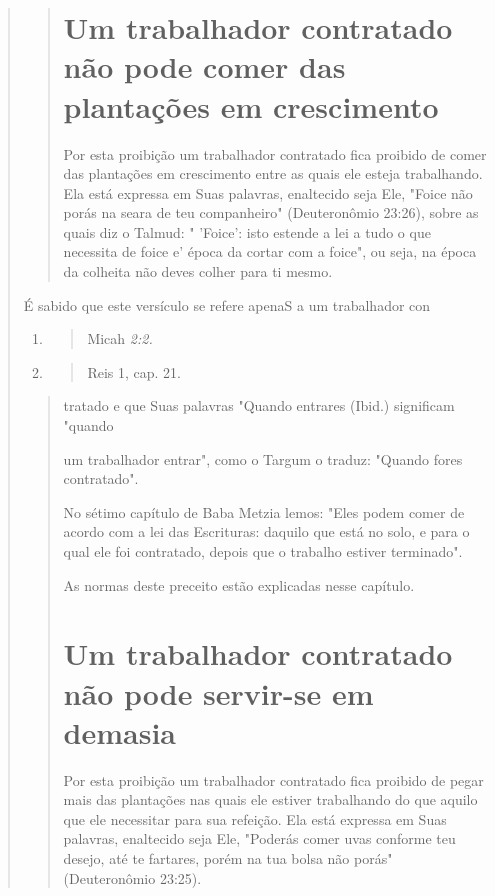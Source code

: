 \begin{quote}
\begin{quote}
\section{Um trabalhador contratado não pode comer das plantações em crescimento}

Por esta proibição um trabalhador contratado fica proibido de co­mer das
plantações em crescimento entre as quais ele esteja trabalhando. Ela
está expressa em Suas palavras, enaltecido seja Ele, "Foice não porás na
seara de teu companheiro" (Deuteronômio 23:26), sobre as quais diz o
Talmud: " 'Foi­ce': isto estende a lei a tudo o que necessita de foice
e' época da cortar com a foice", ou seja, na época da colheita não deves
colher para ti mesmo.
\end{quote}

É sabido que este versículo se refere apenaS a um trabalhador con

\begin{enumerate}
\def\labelenumi{\arabic{enumi}.}
\setcounter{enumi}{408}
\item
 \begin{quote}
 Micah \emph{2:2.}
 \end{quote}
\item
 \begin{quote}
 Reis 1, cap. 21.
 \end{quote}
\end{enumerate}

\begin{quote}

tratado e que Suas palavras "Quando entrares (Ibid.) significam "quando

um trabalhador entrar", como o Targum o traduz: "Quando fores
contratado".

No sétimo capítulo de Baba Metzia lemos: "Eles podem comer de acordo com
a lei das Escrituras: daquilo que está no solo, e para o qual ele foi
contratado, depois que o trabalho estiver terminado".

As normas deste preceito estão explicadas nesse capítulo.

\section{Um trabalhador contratado não pode servir-se em demasia}

Por esta proibição um trabalhador contratado fica proibido de pe­gar
mais das plantações nas quais ele estiver trabalhando do que aquilo que
ele necessitar para sua refeição. Ela está expressa em Suas palavras,
enaltecido seja Ele, "Poderás comer uvas conforme teu desejo, até te
fartares, porém na tua bolsa não porás" (Deuteronômio 23:25).


\end{quote}
\end{quote}
